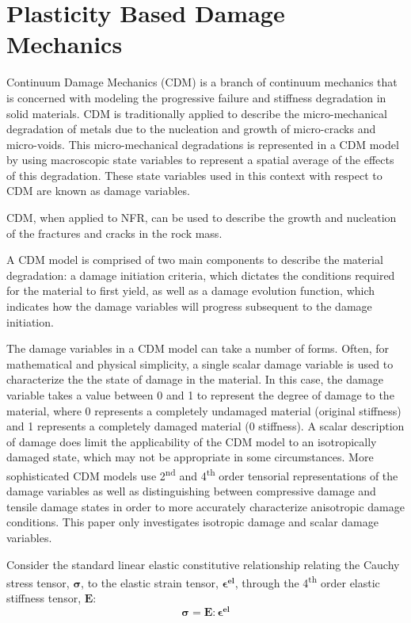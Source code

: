 \section{Plasticity Based Damage Mechanics}

Continuum Damage Mechanics (CDM) is a branch of continuum mechanics that is concerned with modeling the progressive failure and stiffness degradation in solid materials. CDM is traditionally applied to describe the micro-mechanical degradation of metals due to the nucleation and growth of micro-cracks and micro-voids. This micro-mechanical degradations is represented in a CDM model by using macroscopic state variables to represent a spatial average of the effects of this degradation. These state variables used in this context with respect to CDM are known as damage variables. 

CDM, when applied to NFR, can be used to describe the growth and nucleation of the fractures and cracks in the rock mass.

A CDM model is comprised of two main components to describe the material degradation: a damage initiation criteria, which dictates the conditions required for the material to first yield, as well as a damage evolution function, which indicates how the damage variables will progress subsequent to the damage initiation. 

The damage variables in a CDM model can take a number of forms. Often, for mathematical and physical simplicity, a single scalar damage variable is used to characterize the the state of damage in the material. In this case, the damage variable takes a value between 0 and 1 to represent the degree of damage to the material, where 0 represents a completely undamaged material (original stiffness) and 1 represents a completely damaged material (0 stiffness). A scalar description of damage does limit the applicability of the CDM model to an isotropically damaged state, which may not be appropriate in some circumstances. More sophisticated CDM models use 2\textsuperscript{nd} and 4\textsuperscript{th} order tensorial representations of the damage variables as well as distinguishing between compressive damage and tensile damage states in order to more accurately characterize anisotropic damage conditions. This paper only investigates isotropic damage and scalar damage variables. 

Consider the standard linear elastic constitutive relationship relating the Cauchy stress tensor, $\boldsymbol{\sigma}$, to the elastic strain tensor, $\boldsymbol{\epsilon^{el}}$, through the 4\textsuperscript{th} order elastic stiffness tensor, $\mathbf{E}$:
\begin{equation}
\boldsymbol{\sigma}=\mathbf{E}:\boldsymbol{\epsilon^{el}}\label{eqn:const3a}
\end{equation}


